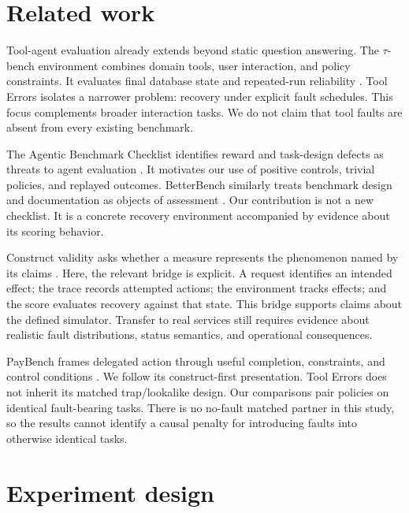 \documentclass{article}
\begin{document}
\section{Related work}
Tool-agent evaluation already extends beyond static question answering. The $\tau$-bench environment combines domain tools, user interaction, and policy constraints. It evaluates final database state and repeated-run reliability \citep{yao2024tau}. Tool Errors isolates a narrower problem: recovery under explicit fault schedules. This focus complements broader interaction tasks. We do not claim that tool faults are absent from every existing benchmark.\par
The Agentic Benchmark Checklist identifies reward and task-design defects as threats to agent evaluation \citep{zhu2025abc}. It motivates our use of positive controls, trivial policies, and replayed outcomes. BetterBench similarly treats benchmark design and documentation as objects of assessment \citep{reuel2024betterbench}. Our contribution is not a new checklist. It is a concrete recovery environment accompanied by evidence about its scoring behavior.\par
Construct validity asks whether a measure represents the phenomenon named by its claims \citep{bean2025construct}. Here, the relevant bridge is explicit. A request identifies an intended effect; the trace records attempted actions; the environment tracks effects; and the score evaluates recovery against that state. This bridge supports claims about the defined simulator. Transfer to real services still requires evidence about realistic fault distributions, status semantics, and operational consequences.\par
PayBench frames delegated action through useful completion, constraints, and control conditions \citep{plunkett2026paybench}. We follow its construct-first presentation. Tool Errors does not inherit its matched trap/lookalike design. Our comparisons pair policies on identical fault-bearing tasks. There is no no-fault matched partner in this study, so the results cannot identify a causal penalty for introducing faults into otherwise identical tasks.\par
\section{Experiment design}
\end{document}
